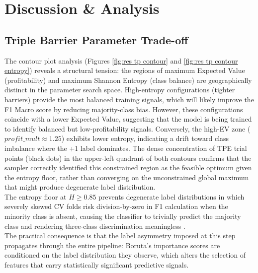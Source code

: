 \section{Discussion \& Analysis}
\label{sec: Discussion}

\subsection{Triple Barrier Parameter Trade-off}
The contour plot analysis (Figures \ref{fig:res tp contour} and \ref{fig:res tp contour entropy}) reveals a structural tension: the regions of maximum Expected Value (profitability) and maximum Shannon Entropy (class balance) are geographically distinct in the parameter search space. High-entropy configurations (tighter barriers) provide the most balanced training signals, which will likely improve the F1 Macro score by reducing majority-class bias. However, these configurations coincide with a lower Expected Value, suggesting that the model is being trained to identify balanced but low-profitability signals. Conversely, the high-EV zone ($profit\_mult \approx 1.25$) exhibits lower entropy, indicating a drift toward class imbalance where the +1 label dominates.
The dense concentration of TPE trial points (black dots) in the upper-left quadrant of both contours confirms that the sampler correctly identified this constrained region as the feasible optimum given the entropy floor, rather than converging on the unconstrained global maximum that might produce degenerate label distribution.\\
The entropy floor at $H \geq 0.85$ prevents degenerate label distributions in which severely skewed CV folds risk division-by-zero in F1 calculation when the minority class is absent, causing the classifier to trivially predict the majority class and rendering three-class discrimination meaningless \cite{lopezdepradoAdvancesFinancialMachine2018}.\\
The practical consequence is that the label asymmetry imposed at this step propagates through the entire pipeline: Boruta's importance scores are conditioned on the label distribution they observe, which alters the selection of features that carry statistically significant predictive signals.
